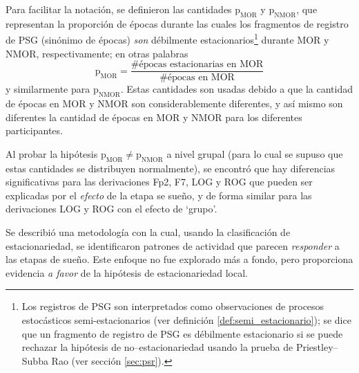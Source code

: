 \documentclass[12pt,letterpaper]{book}
\begin{document}
Para facilitar la notación, se definieron las cantidades $\text{p}_{\text{MOR}}$ y $\text{p}_{\text{NMOR}}$, que representan la proporción de épocas durante las cuales los fragmentos de registro de PSG (sinónimo de épocas) \textit{son} débilmente estacionarios\footnote{Los registros de PSG son interpretados como observaciones de procesos estocásticos semi-estacionarios (ver definición \ref{def:semi_estacionario}); se dice que un fragmento de registro de PSG es débilmente estacionario si se puede rechazar la hipótesis de no--estacionariedad usando la prueba de Priestley--Subba Rao (ver sección \ref{sec:psr}).} durante MOR y NMOR, respectivamente; en otras palabras
\begin{equation}
\text{p}_{\text{MOR}} = \frac{\text{\# épocas estacionarias en MOR}}{\text{\# épocas en MOR}}
\end{equation}
y similarmente para $\text{p}_{\text{NMOR}}$. 
%
Estas cantidades son usadas debido a que la cantidad de épocas en MOR y NMOR son considerablemente diferentes, y así mismo son diferentes la cantidad de épocas en MOR y NMOR para los diferentes participantes.


Al probar la hipótesis $\text{p}_{\text{MOR}} \neq \text{p}_{\text{NMOR}}$ a nivel grupal (para lo cual se supuso que estas cantidades se distribuyen normalmente), se  encontró que hay diferencias significativas para las derivaciones Fp2, F7, LOG y ROG que pueden ser explicadas por el \textit{efecto} de la etapa se sueño, y de forma similar para las derivaciones LOG y ROG con el efecto de `grupo'.

Se describió una metodología con la cual, usando la clasificación de estacionariedad, se identificaron patrones de actividad que parecen \textit{responder} a las etapas de sueño.
%
Este enfoque no fue explorado más a fondo, pero proporciona evidencia \textit{a favor} de la hipótesis de estacionariedad local.

\end{document}
